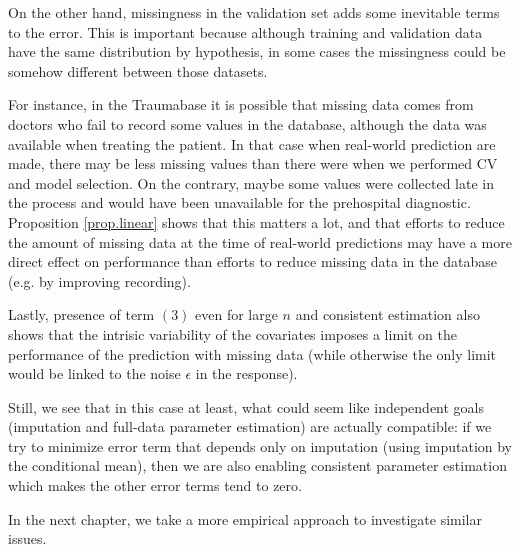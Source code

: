 On the other hand, missingness in the validation set adds some inevitable terms to the error. This is important because although training and validation data have the same distribution by hypothesis, in some cases the missingness could be somehow different between those datasets.  

For instance, in the Traumabase it is possible that missing data comes from doctors who fail to record some values in the database, although the data was available when treating the patient. In that case when real-world prediction are made, there may be less missing values than there were when we performed CV and model selection. On the contrary, maybe some values were collected late in the process and would have been unavailable for the prehospital diagnostic. Proposition \ref{prop.linear} shows that this matters a lot, and that efforts to reduce the amount of missing data at the time of real-world predictions may have a more direct effect on performance than efforts to reduce missing data in the database (e.g. by improving recording). 

Lastly, presence of term $(3)$ even for large $n$ and consistent estimation also shows that the intrisic variability of the covariates imposes a limit on the performance of the prediction with missing data (while otherwise the only limit would be linked to the noise $\epsilon$ in the response). 

Still, we see that in this case at least, what could seem like independent goals (imputation and full-data parameter estimation) are actually compatible: if we try to minimize error term that depends only on imputation (using imputation by the conditional mean), then we are also enabling consistent parameter estimation which makes the other error terms tend to zero.

In the next chapter, we take a more empirical approach to investigate similar issues.